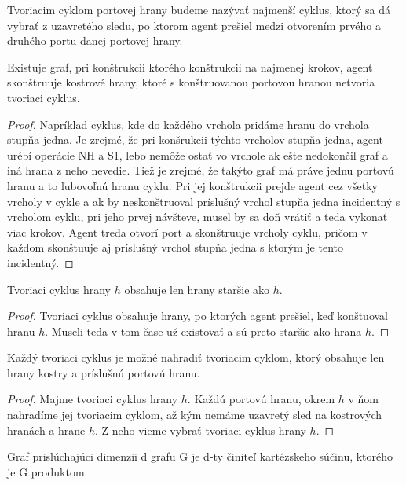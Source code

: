 \begin{ozn}
Tvoriacim cyklom portovej hrany budeme nazývať najmenší cyklus, ktorý sa dá vybrať z
uzavretého sledu, po ktorom agent prešiel medzi otvorením prvého a druhého
portu danej portovej hrany.
\end{ozn}

\begin{lem}
Existuje graf, pri konštrukcii ktorého konštrukcii na najmenej krokov, agent
skonštruuje kostrové hrany, ktoré s konštruovanou portovou hranou netvoria
tvoriaci cyklus.
\end{lem}
\begin{proof}
Napríklad cyklus, kde do každého vrchola pridáme hranu do vrchola stupňa
jedna. Je zrejmé, že pri konšrukcii týchto vrcholov stupňa jedna, agent
urébí operácie NH a S1, lebo nemôže ostať vo vrchole ak ešte nedokončil graf
a iná hrana z neho nevedie. Tiež je zrejmé, že takýto graf má práve jednu
portovú hranu a to ľubovoľnú hranu cyklu. Pri jej konštrukcii prejde agent
cez všetky vrcholy v cykle a ak by neskonštruoval príslušný vrchol stupňa
jedna incidentný s vrcholom cyklu, pri jeho prvej návšteve, musel by sa doň
vrátiť a teda vykonať viac krokov. Agent treda otvorí port a skonštruuje
vrcholy cyklu, pričom v každom skonštuuje aj príslušný vrchol stupňa jedna s
ktorým je tento incidentný.
\end{proof}

\begin{lem}
Tvoriaci cyklus hrany $h$ obsahuje len hrany staršie ako $h$.
\end{lem}
\begin{proof}
Tvoriaci cyklus obsahuje hrany, po ktorých agent prešiel, keď konštuoval
hranu $h$. Museli teda v tom čase už existovať a sú preto staršie ako hrana
$h$.
\end{proof}


\begin{lem}
\label{cyklus}
Každý tvoriaci cyklus je možné nahradiť tvoriacim cyklom, ktorý obsahuje len
hrany kostry a príslušnú portovú hranu.
\end{lem}
\begin{proof}
Majme tvoriaci cyklus hrany $h$. Každú portovú hranu, okrem $h$  v ňom nahradíme jej tvoriacim
cyklom, až kým nemáme uzavretý sled na kostrových hranách a hrane $h$. Z
neho vieme vybrať tvoriaci cyklus hrany $h$.
\end{proof}



\begin{ozn}
Graf prislúchajúci dimenzii d grafu G je d-ty činiteľ kartézskeho súčinu, ktorého
je G produktom.
\end{ozn}

